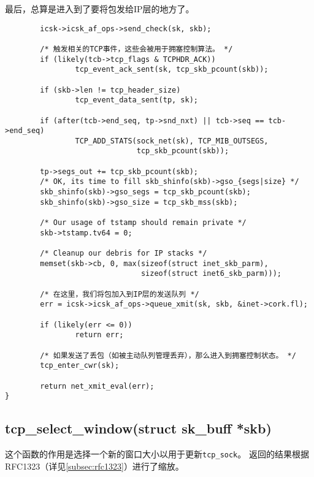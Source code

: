 最后，总算是进入到了要将包发给IP层的地方了。
\begin{verbatim}
        icsk->icsk_af_ops->send_check(sk, skb);

        /* 触发相关的TCP事件，这些会被用于拥塞控制算法。 */
        if (likely(tcb->tcp_flags & TCPHDR_ACK))
                tcp_event_ack_sent(sk, tcp_skb_pcount(skb));

        if (skb->len != tcp_header_size)
                tcp_event_data_sent(tp, sk);

        if (after(tcb->end_seq, tp->snd_nxt) || tcb->seq == tcb->end_seq)
                TCP_ADD_STATS(sock_net(sk), TCP_MIB_OUTSEGS,
                              tcp_skb_pcount(skb));

        tp->segs_out += tcp_skb_pcount(skb);
        /* OK, its time to fill skb_shinfo(skb)->gso_{segs|size} */
        skb_shinfo(skb)->gso_segs = tcp_skb_pcount(skb);
        skb_shinfo(skb)->gso_size = tcp_skb_mss(skb);

        /* Our usage of tstamp should remain private */
        skb->tstamp.tv64 = 0;

        /* Cleanup our debris for IP stacks */
        memset(skb->cb, 0, max(sizeof(struct inet_skb_parm),
                               sizeof(struct inet6_skb_parm)));

        /* 在这里，我们将包加入到IP层的发送队列 */
        err = icsk->icsk_af_ops->queue_xmit(sk, skb, &inet->cork.fl);

        if (likely(err <= 0))
                return err;

        /* 如果发送了丢包（如被主动队列管理丢弃），那么进入到拥塞控制状态。 */
        tcp_enter_cwr(sk);

        return net_xmit_eval(err);
}
\end{verbatim}

\subsection{tcp\_select\_window(struct sk\_buff *skb)}
这个函数的作用是选择一个新的窗口大小以用于更新\texttt{tcp_sock}。
返回的结果根据RFC1323（详见\ref{subsec:rfc1323}）进行了缩放。

